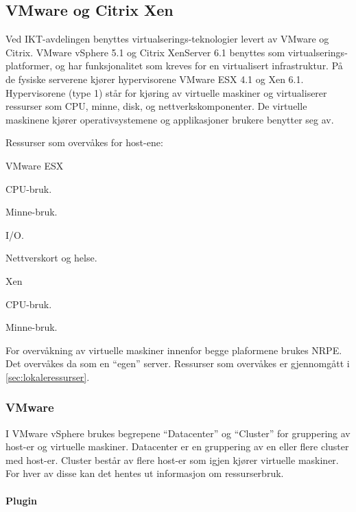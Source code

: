 \subsection{VMware og Citrix Xen}
Ved IKT-avdelingen benyttes virtualserings-teknologier levert av VMware og Citrix. VMware vSphere 5.1 og Citrix XenServer 6.1 benyttes som virtualserings-platformer, og har funksjonalitet som kreves for en virtualisert infrastruktur. På de fysiske serverene kjører hypervisorene VMware ESX 4.1 og Xen 6.1. Hypervisorene (type 1) står for kjøring av virtuelle maskiner og virtualiserer ressurser som CPU, minne, disk, og nettverkskomponenter. De virtuelle maskinene kjører operativsystemene og applikasjoner brukere benytter seg av.  

Ressurser som overvåkes for host-ene:
\begin{itemize*}
\item VMware ESX
	\begin{itemize*}
	\item CPU-bruk.
	\item Minne-bruk.
	\item I/O.
	\item Nettverskort og helse.
	\end{itemize*}
\item Xen
	\begin{itemize*}
	\item CPU-bruk.
	\item Minne-bruk.
	\end{itemize*}
\end{itemize*}


For overvåkning av virtuelle maskiner innenfor begge plaformene brukes NRPE. Det overvåkes da som en ``egen'' server. Ressurser som overvåkes er gjennomgått i \ref{sec:lokaleressurser}.

\subsubsection{VMware}
I VMware vSphere brukes begrepene ``Datacenter'' og ``Cluster'' for gruppering av host-er og virtuelle maskiner.  Datacenter er en gruppering av en eller flere cluster med host-er. Cluster består av flere host-er som igjen kjører virtuelle maskiner. For hver av disse kan det hentes ut informasjon om ressurserbruk. 

\paragraph{Plugin} \mbox\\

